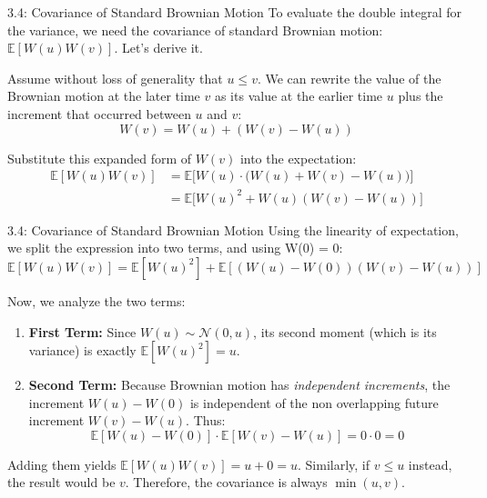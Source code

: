 \documentclass{beamer}
\begin{document}
	\begin{frame}{3.4: Covariance of Standard Brownian Motion}
		To evaluate the double integral for the variance, we need the covariance of standard Brownian motion: $\mathbb{E}[W(u)W(v)]$. Let's derive it.
		
		\vspace{0.3cm}
		Assume without loss of generality that $u \le v$. We can rewrite the value of the Brownian motion at the later time $v$ as its value at the earlier time $u$ plus the increment that occurred between $u$ and $v$:
		$$ W(v) = W(u) + (W(v) - W(u)) $$
		
		\vspace{0.3cm}
		Substitute this expanded form of $W(v)$ into the expectation:
		\begin{align*}
			\mathbb{E}[W(u)W(v)] &= \mathbb{E}\big[W(u) \cdot \big(W(u) + W(v) - W(u)\big)\big] \\
			&= \mathbb{E}\big[W(u)^2 + W(u)(W(v) - W(u))\big]
		\end{align*}
	\end{frame}
	
	\begin{frame}{3.4: Covariance of Standard Brownian Motion}
		Using the linearity of expectation, we split the expression into two terms, and using W(0) = 0:
		$$ \mathbb{E}[W(u)W(v)] = \mathbb{E}[W(u)^2] + \mathbb{E}[(W(u) - W(0))(W(v) - W(u))] $$
		
		\vspace{0.3cm}
		Now, we analyze the two terms:
		\begin{enumerate}
			\item \textbf{First Term:} Since $W(u) \sim \mathcal{N}(0, u)$, its second moment (which is its variance) is exactly $\mathbb{E}[W(u)^2] = u$.
			\item \textbf{Second Term:} Because Brownian motion has \textit{independent increments}, the increment $W(u) - W(0)$ is independent of the non overlapping future increment $W(v) - W(u)$. Thus:
			$$ \mathbb{E}[W(u) - W(0)] \cdot \mathbb{E}[W(v) - W(u)] = 0 \cdot 0 = 0 $$
		\end{enumerate}
		
		\vspace{0.3cm}
		Adding them yields $\mathbb{E}[W(u)W(v)] = u + 0 = u$. Similarly, if $v \le u$ instead, the result would be $v$. Therefore, the covariance is always $\min(u, v)$.
	\end{frame}
	
\end{document}
